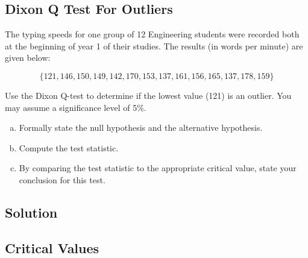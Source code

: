 \documentclass[]{report}
\begin{document}
\subsection*{Dixon Q Test For Outliers}
\noindent 
The typing speeds for one group of 12 Engineering students were recorded both at the beginning 
of year 1 of their studies. 
The results (in words per minute) are given below: 

\[\{121, 146, 150, 149, 142, 170, 153, 137, 161, 156, 165,  137, 178, 159\} \]

Use the Dixon Q-test to determine if the lowest value (121) is an outlier. 
You may assume a significance level of 5\%. 
\begin{enumerate}[(a)]
\item Formally state the null hypothesis and the alternative hypothesis. \item Compute the test statistic. 
\item By comparing the test statistic to the appropriate critical value, state your conclusion for this test. 

\end{enumerate}
\subsection*{Solution}

\subsection*{Critical Values}
\end{document}
